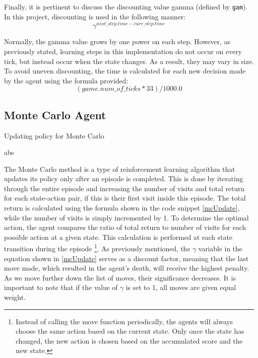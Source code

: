 Finally, it is pertinent to discuss the discounting value gamma (defined by \texttt{gam}). In this project, discounting is used in the following manner: $$\gamma^{next\_step.time - curr\_step.time}$$

Normally, the gamma value grows by one power on each step. However, as previously stated, learning steps in this implementation do not occur on every tick, but instead occur when the state changes. As a result, they may vary in size. To avoid uneven discounting, the time is calculated for each new decision made by the agent using the formula provided:  $$(game.num\_of\_ticks * 33) / 1000.0$$

\subsection{Monte Carlo Agent}

\begin{algorithm}
\caption{Updating policy for Monte Carlo}\label{mcUpdate}
\begin{algorithmic}[1]
\State abs
\end{algorithmic}
\end{algorithm}

The Monte Carlo method is a type of reinforcement learning algorithm that updates its policy only after an episode is completed. This is done by iterating through the entire episode and increasing the number of visits and total return for each state-action pair, if this is their first visit inside this episode. The total return is calculated using the formula shown in the code snippet \ref{mcUpdate}, while the number of visits is simply incremented by 1. To determine the optimal action, the agent compares the ratio of total return to number of visits for each possible action at a given state. This calculation is performed at each state transition during the episode \footnote{Instead of calling the move function periodically, the agents will always choose the same action based on the current state. Only once the state has changed, the new action is chosen based on the accumulated score and the new state.}.
As previously mentioned, the $\gamma$ variable in the equation shown in \ref{mcUpdate} serves as a discount factor, meaning that the last move made, which resulted in the agent's death, will receive the highest penalty. As we move further down the list of moves, their significance decreases. It is important to note that if the value of $\gamma$ is set to 1, all moves are given equal weight. 


